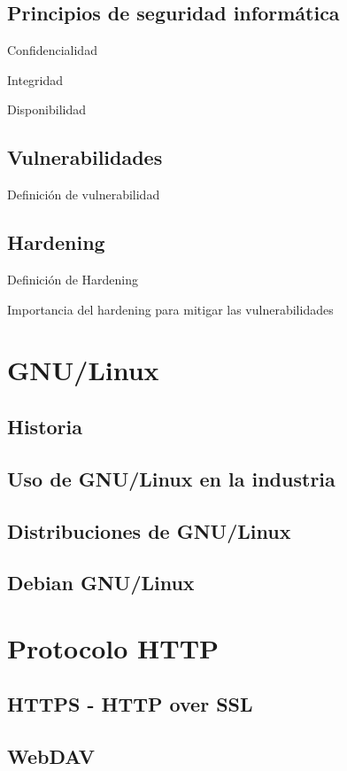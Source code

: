       \subsection {Principios de seguridad inform\'{a}tica}

Confidencialidad

Integridad

Disponibilidad

      \subsection {Vulnerabilidades}

Definici\'{o}n de vulnerabilidad

      \subsection {Hardening}

Definici\'{o}n de Hardening

Importancia del hardening para mitigar las vulnerabilidades

    \section {GNU/Linux}
      \subsection {Historia}
      \subsection {Uso de GNU/Linux en la industria}
      \subsection {Distribuciones de GNU/Linux}
      \subsection {Debian GNU/Linux}
    \section {Protocolo HTTP}
      \subsection {HTTPS - HTTP over SSL}
      \subsection {WebDAV}
